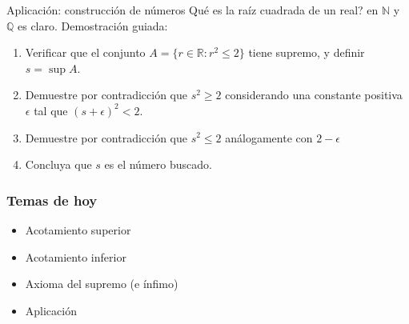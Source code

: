 \documentclass[14pt,aspectratio=169,xcolor=dvipsnames]{beamer}
\newcommand{\R}{\mathbb{R}}
\begin{document}
\begin{frame}{Aplicación: construcción de números}
    Qué es la raíz cuadrada de un real? 
    \pause en $\mathbb N$ y $\mathbb Q$ es claro. Demostración guiada:
    \begin{enumerate}
        \item Verificar que el conjunto $A=\{r\in \R: r^2\leq2\}$ tiene supremo, y definir $s = \sup A$. 
        \item Demuestre por contradicción que $s^2\geq 2$ considerando una constante positiva $\epsilon$ tal que $(s+\epsilon)^2 < 2$.
        \item Demuestre por contradicción que $s^2\leq 2$ análogamente con $2-\epsilon$
        \item Concluya que $s$ es el número buscado.
    \end{enumerate}
\end{frame}
\begin{frame}\frametitle{Temas de hoy}
    \begin{itemize}
        \item Acotamiento superior
        \item Acotamiento inferior
        \item Axioma del supremo (e ínfimo)
        \item Aplicación
    \end{itemize}
\end{frame}
\begin{frame}
    \maketitle
\end{frame}
\end{document}

